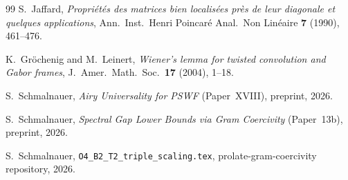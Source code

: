 \documentclass[12pt,a4paper]{amsart}
\theoremstyle{definition}
\begin{document}
\begin{thebibliography}{99}
S.~Jaffard, \textit{Propri\'et\'es des matrices bien localis\'ees
pr\`es de leur diagonale et quelques applications},
Ann.\ Inst.\ Henri Poincar\'e Anal.\ Non Lin\'eaire \textbf{7} (1990), 461--476.

K.~Gr\"ochenig and M.~Leinert,
\textit{Wiener's lemma for twisted convolution and Gabor frames},
J.\ Amer.\ Math.\ Soc.\ \textbf{17} (2004), 1--18.

S.~Schmalnauer,
\textit{Airy Universality for PSWF} (Paper~XVIII),
preprint, 2026.

S.~Schmalnauer,
\textit{Spectral Gap Lower Bounds via Gram Coercivity} (Paper~13b),
preprint, 2026.

S.~Schmalnauer,
\texttt{O4\_B2\_T2\_triple\_scaling.tex},
\textsf{prolate-gram-coercivity} repository, 2026.
\end{thebibliography}
\end{document}
